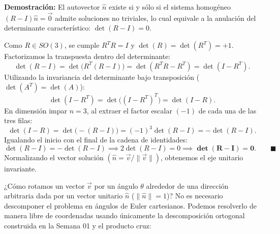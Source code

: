 \documentclass[11pt,letterpaper]{article}
\begin{document}
\textbf{Demostración:}
El autovector $\hat{n}$ existe si y sólo si el sistema homogéneo $(R - I)\hat{n} = \vec{0}$ admite soluciones no triviales, lo cual equivale a la anulación del determinante característico: $\det(R - I) = 0$.

Como $R \in SO(3)$, se cumple $R^T R = I$ y $\det(R) = \det(R^T) = +1$. Factorizamos la transpuesta dentro del determinante:
\[
\det(R - I) = \det\big(R^T(R - I)\big) = \det(R^T R - R^T) = \det(I - R^T).
\]
Utilizando la invariancia del determinante bajo transposición ($\det(A^T) = \det(A)$):
\[
\det(I - R^T) = \det\big((I - R^T)^T\big) = \det(I - R).
\]
En dimensión impar $n = 3$, al extraer el factor escalar $(-1)$ de cada una de las tres filas:
\[
\det(I - R) = \det\big(-(R - I)\big) = (-1)^3 \det(R - I) = -\det(R - I).
\]
Igualando el inicio con el final de la cadena de identidades:
\[
\det(R - I) = -\det(R - I) \implies 2\det(R - I) = 0 \implies \mathbf{\det(R - I) = 0}. \qquad \blacksquare
\]
Normalizando el vector solución $(\hat{n} = \vec{v}/\|\vec{v}\|)$, obtenemos el eje unitario invariante.


¿Cómo rotamos un vector $\vec{v}$ por un ángulo $\theta$ alrededor de una dirección arbitraria dada por un vector unitario $\hat{n}$ ($\|\hat{n}\| = 1$)?
No es necesario descomponer el problema en ángulos de Euler cartesianos. Podemos resolverlo de manera libre de coordenadas usando únicamente la descomposición ortogonal construida en la Semana 01 y el producto cruz:
\end{document}
